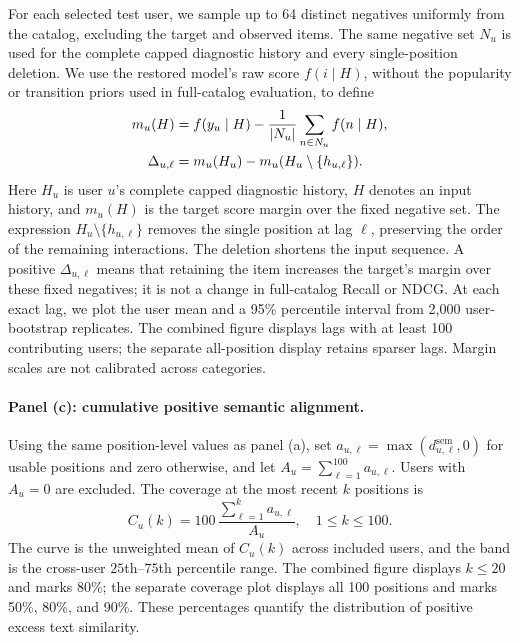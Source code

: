 ﻿\documentclass[sigconf,anonymous,review]{acmart}
\begin{document}
For each selected test user, we sample up to 64 distinct negatives uniformly from the catalog, excluding the target and observed items. The same negative set $N_u$ is used for the complete capped diagnostic history and every single-position deletion. We use the restored model's raw score $f(i\mid H)$, without the popularity or transition priors used in full-catalog evaluation, to define
\begin{align}
 m_u(H)&=f(y_u\mid H)-\frac{1}{|N_u|}\sum_{n\in N_u}f(n\mid H), \notag\\
 \Delta_{u,\ell}&=m_u(H_u)-m_u(H_u\setminus\{h_{u,\ell}\}).
 \label{eq:prelim_influence}
\end{align}
Here $H_u$ is user $u$'s complete capped diagnostic history, $H$ denotes an input history, and $m_u(H)$ is the target score margin over the fixed negative set. The expression $H_u\setminus\{h_{u,\ell}\}$ removes the single position at lag $\ell$, preserving the order of the remaining interactions. The deletion shortens the input sequence. A positive $\Delta_{u,\ell}$ means that retaining the item increases the target's margin over these fixed negatives; it is not a change in full-catalog Recall or NDCG. At each exact lag, we plot the user mean and a 95\% percentile interval from 2,000 user-bootstrap replicates. The combined figure displays lags with at least 100 contributing users; the separate all-position display retains sparser lags. Margin scales are not calibrated across categories.

\paragraph{Panel (c): cumulative positive semantic alignment.}
Using the same position-level values as panel (a), set $a_{u,\ell}=\max(d^{\mathrm{sem}}_{u,\ell},0)$ for usable positions and zero otherwise, and let $A_u=\sum_{\ell=1}^{100}a_{u,\ell}$. Users with $A_u=0$ are excluded. The coverage at the most recent $k$ positions is
\begin{equation}
 C_u(k)=100\,\frac{\sum_{\ell=1}^{k}a_{u,\ell}}{A_u},
 \quad 1\leq k\leq100.
 \label{eq:prelim_coverage}
\end{equation}
The curve is the unweighted mean of $C_u(k)$ across included users, and the band is the cross-user $25$th--$75$th percentile range. The combined figure displays $k\leq20$ and marks 80\%; the separate coverage plot displays all 100 positions and marks 50\%, 80\%, and 90\%. These percentages quantify the distribution of positive excess text similarity.
\end{document}
